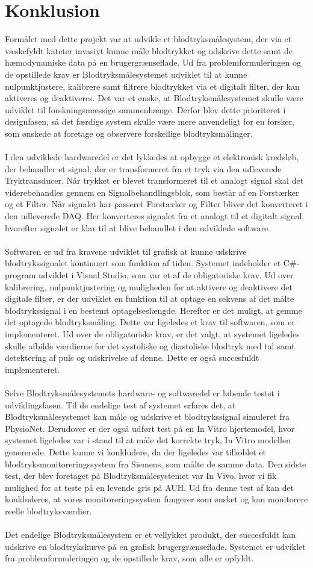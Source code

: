 \chapter{Konklusion}
Formålet med dette projekt var at udvikle et blodtryksmålesystem, der via et væskefyldt kateter invasivt kunne måle blodtrykket og udskrive dette samt de hæmodynamiske data på en brugergrænseflade. Ud fra problemformuleringen og de opstillede krav er Blodtryksmålesystemet udviklet til at kunne nulpunktjustere, kalibrere samt filtrere blodtrykket via et digitalt filter, der kan aktiveres og deaktiveres. 
Det var et ønske, at Blodtryksmålesystemet skulle være udviklet til forskningsmæssige sammenhænge. Derfor blev dette prioriteret i designfasen, så det færdige system skulle være mere anvendeligt for en forsker, som ønskede at foretage og observere forskellige blodtryksmålinger.\\\\
I den udviklede hardwaredel er det lykkedes at opbygge et elektronisk kredsløb, der behandler et signal, der er transformeret fra et tryk via den udleverede Tryktransducer. Når trykket er blevet transformeret til et analogt signal skal det viderebehandles gennem en Signalbehandlingsblok, som består af en Forstærker og et Filter. Når signalet har passeret Forstærker og Filter bliver det konverteret i den udleverede DAQ. Her konverteres signalet fra et analogt til et digitalt signal, hvorefter signalet er klar til at blive behandlet i den udviklede software. \\\\
Softwaren er ud fra kravene udviklet til grafisk at kunne udskrive blodtrykssignalet kontinuert som funktion af tiden. Systemet indeholder et C\#-program udviklet i Visual Studio, som var et af de obligatoriske krav. Ud over kalibrering, nulpunktjustering og muligheden for at aktivere og deaktivere det digitale filter, er der udviklet en funktion til at optage en sekvens af det målte blodtrykssignal i en bestemt optagelseslængde. Herefter er det muligt, at gemme det optagede blodtryksmåling. Dette var ligeledes et krav til softwaren, som er implementeret. Ud over de obligatoriske krav, er det valgt, at systemet ligeledes skulle afbilde værdierne for det systoliske og diastoliske blodtryk med tal samt detektering af puls og udskrivelse af denne. Dette er også succesfuldt implementeret. \\\\
Selve Blodtryksmålesystemets hardware- og softwaredel er løbende testet i udviklingsfasen. Til de endelige test af systemet erfares det, at Blodtryksmålesystemet kan måle og udskrive et blodtrykssignal simuleret fra PhysioNet. Derudover er der også udført test på en In Vitro hjertemodel, hvor systemet ligeledes var i stand til at måle det korrekte tryk, In Vitro modellen genererede. Dette kunne vi konkludere, da der ligeledes var tilkoblet et blodtryksmonitoreringssystem fra Siemens, som målte de samme data. Den sidste test, der blev foretaget på Blodtryksmålesystemet var In Vivo, hvor vi fik mulighed for at teste på en levende gris på AUH. Ud fra denne test af kan det konkluderes, at vores monitoreringssystem fungerer som ønsket og kan monitorere reelle blodtryksværdier.\\\\
Det endelige Blodtryksmålesystem er et vellykket produkt, der succesfuldt kan udskrive en blodtrykskurve på en grafisk brugergrænseflade. Systemet er udviklet fra problemformuleringen og de opstillede krav, som alle er opfyldt. 
